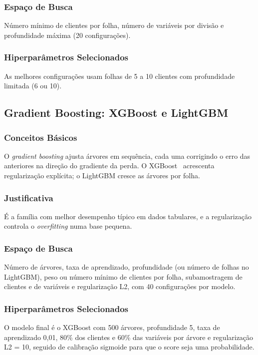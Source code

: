 \documentclass[conference]{IEEEtran}
\begin{document}
\subsubsection{Espaço de Busca}
Número mínimo de clientes por folha, número de variáveis por divisão e profundidade máxima (20 configurações).
\subsubsection{Hiperparâmetros Selecionados}
As melhores configurações usam folhas de 5 a 10 clientes com profundidade limitada (6 ou 10).

\subsection{Gradient Boosting: XGBoost e LightGBM}
\subsubsection{Conceitos Básicos}
O \textit{gradient boosting} ajusta árvores em sequência, cada uma corrigindo o erro das anteriores na direção do gradiente da perda. O XGBoost~\cite{chen2016} acrescenta regularização explícita; o LightGBM cresce as árvores por folha.
\subsubsection{Justificativa}
É a família com melhor desempenho típico em dados tabulares, e a regularização controla o \textit{overfitting} numa base pequena.
\subsubsection{Espaço de Busca}
Número de árvores, taxa de aprendizado, profundidade (ou número de folhas no LightGBM), peso ou número mínimo de clientes por folha, subamostragem de clientes e de variáveis e regularização L2, com 40 configurações por modelo.
\subsubsection{Hiperparâmetros Selecionados}
O modelo final é o XGBoost com 500 árvores, profundidade 5, taxa de aprendizado 0,01, 80\% dos clientes e 60\% das variáveis por árvore e regularização L2 = 10, seguido de calibração sigmoide para que o score seja uma probabilidade.
\end{document}
